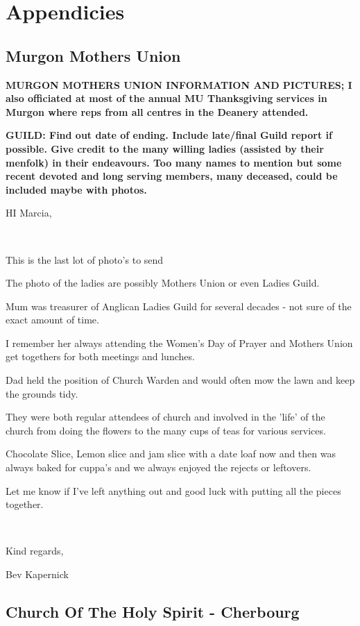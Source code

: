 \hypertarget{appendicies}{%
\chapter{Appendicies}\label{appendicies}}

\hypertarget{murgon-mothers-union}{%
\section{Murgon Mothers Union}\label{murgon-mothers-union}}

\textbf{MURGON MOTHERS UNION INFORMATION AND PICTURES; I also officiated
at most of the annual MU Thanksgiving services in Murgon where reps from
all centres in the Deanery attended.}

\textbf{GUILD: Find out date of ending. Include late/final Guild report
if possible. Give credit to the many willing ladies (assisted by their
menfolk) in their endeavours. Too many names to mention but some recent
devoted and long serving members, many deceased, could be included maybe
with photos.}

HI Marcia,

~

This is the last lot of photo's to send

The photo of the ladies are possibly Mothers Union or even Ladies Guild.

Mum was treasurer of Anglican Ladies Guild for several decades - not
sure of the exact amount of time.

I remember her always attending the Women's Day of Prayer and Mothers
Union get togethers for both meetings and lunches.

Dad held the position of Church Warden and would often mow the lawn and
keep the grounds tidy.

They were both regular attendees of church and involved in the 'life' of
the church from doing the flowers to the many cups of teas for various
services.

Chocolate Slice, Lemon slice and jam slice with a date loaf now and then
was always baked for cuppa's and we always enjoyed the rejects or
leftovers.

Let me know if I've left anything out and good luck with putting all the
pieces together.

~

Kind regards,

Bev Kapernick

\hypertarget{church-of-the-holy-spirit---cherbourg}{%
\section{Church Of The Holy Spirit -
Cherbourg}\label{church-of-the-holy-spirit---cherbourg}}

